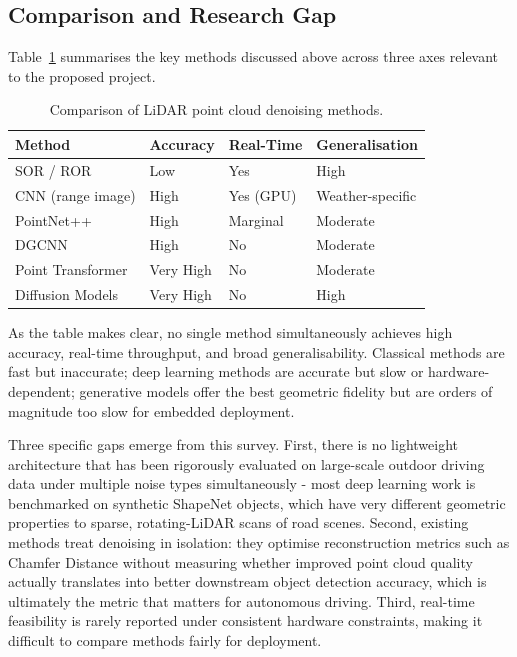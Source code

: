 \documentclass[12pt,a4paper]{article}
\begin{document}
\subsection{Comparison and Research Gap}

Table~\ref{tab:comparison} summarises the key methods discussed above across
three axes relevant to the proposed project.

\begin{table}[h]
\centering
\caption{Comparison of LiDAR point cloud denoising methods.}
\label{tab:comparison}
\renewcommand{\arraystretch}{1.3}
\begin{tabular}{|p{4.2cm}|p{2.5cm}|p{2.6cm}|p{3.6cm}|}
\hline
\textbf{Method} & \textbf{Accuracy} & \textbf{Real-Time} & \textbf{Generalisation}\\\hline
SOR / ROR \cite{rusu2011pcl} & Low & Yes & High\\\hline
CNN (range image) \cite{heinzler2020cnn} & High & Yes (GPU) & Weather-specific\\\hline
PointNet++ \cite{qi2017pointnetpp} & High & Marginal & Moderate\\\hline
DGCNN \cite{wang2019dgcnn} & High & No & Moderate\\\hline
Point Transformer \cite{zhao2021point} & Very High & No & Moderate\\\hline
Diffusion Models \cite{ho2020ddpm} & Very High & No & High\\\hline
\end{tabular}
\end{table}

As the table makes clear, no single method simultaneously achieves high
accuracy, real-time throughput, and broad generalisability. Classical methods
are fast but inaccurate; deep learning methods are accurate but slow or
hardware-dependent; generative models offer the best geometric fidelity but
are orders of magnitude too slow for embedded deployment.

Three specific gaps emerge from this survey. First, there is no lightweight
architecture that has been rigorously evaluated on large-scale outdoor
driving data under multiple noise types simultaneously - most deep learning
work is benchmarked on synthetic ShapeNet objects, which have very different
geometric properties to sparse, rotating-LiDAR scans of road scenes. Second,
existing methods treat denoising in isolation: they optimise reconstruction
metrics such as Chamfer Distance without measuring whether improved point
cloud quality actually translates into better downstream object detection
accuracy, which is ultimately the metric that matters for autonomous driving.
Third, real-time feasibility is rarely reported under consistent hardware
constraints, making it difficult to compare methods fairly for deployment.
\end{document}
